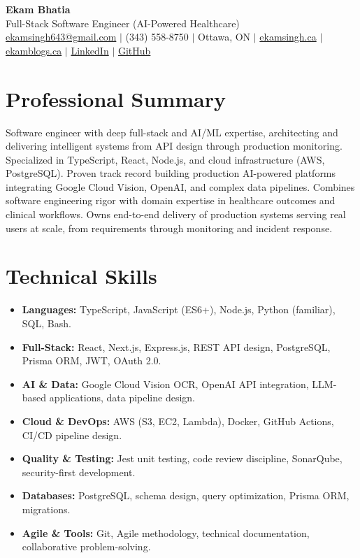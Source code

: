 \documentclass[11pt,a4paper]{article}
\begin{document}
\begin{center}
    {\LARGE \textbf{Ekam Bhatia}} \\
    \vspace{2pt}
    {\normalsize Full-Stack Software Engineer (AI-Powered Healthcare) } \\
    \vspace{4pt}
    \small
    \href{mailto:ekamsingh643@gmail.com}{ekamsingh643@gmail.com} $|$
    (343) 558-8750 $|$ Ottawa, ON $|$
    \href{https://www.ekamsingh.ca}{ekamsingh.ca} $|$
    \href{https://www.ekamblogs.ca}{ekamblogs.ca} $|$
    \href{https://www.linkedin.com/in/ekam-bhatia-335840168}{LinkedIn} $|$
    \href{https://github.com/bhat0155}{GitHub}
\end{center}

\section{Professional Summary}
Software engineer with deep full-stack and AI/ML expertise, architecting and delivering intelligent systems from API design through production monitoring. Specialized in TypeScript, React, Node.js, and cloud infrastructure (AWS, PostgreSQL). Proven track record building production AI-powered platforms integrating Google Cloud Vision, OpenAI, and complex data pipelines. Combines software engineering rigor with domain expertise in healthcare outcomes and clinical workflows. Owns end-to-end delivery of production systems serving real users at scale, from requirements through monitoring and incident response.

\section{Technical Skills}
\begin{itemize}
    \item \textbf{Languages:} TypeScript, JavaScript (ES6+), Node.js, Python (familiar), SQL, Bash.
    \item \textbf{Full-Stack:} React, Next.js, Express.js, REST API design, PostgreSQL, Prisma ORM, JWT, OAuth 2.0.
    \item \textbf{AI \& Data:} Google Cloud Vision OCR, OpenAI API integration, LLM-based applications, data pipeline design.
    \item \textbf{Cloud \& DevOps:} AWS (S3, EC2, Lambda), Docker, GitHub Actions, CI/CD pipeline design.
    \item \textbf{Quality \& Testing:} Jest unit testing, code review discipline, SonarQube, security-first development.
    \item \textbf{Databases:} PostgreSQL, schema design, query optimization, Prisma ORM, migrations.
    \item \textbf{Agile \& Tools:} Git, Agile methodology, technical documentation, collaborative problem-solving.
\end{itemize}
\end{document}

